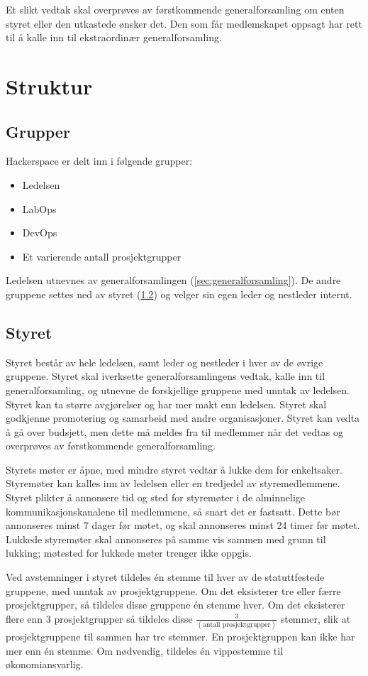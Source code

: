 Et slikt vedtak skal overprøves av førstkommende generalforsamling om enten styret eller den utkastede ønsker det. Den som får medlemskapet oppsagt har rett til å kalle inn til ekstraordinær generalforsamling.


\section{Struktur}\label{sec:struktur}
\subsection{Grupper}\label{sec:struktur:grupper}
Hackerspace er delt inn i følgende grupper:
\begin{itemize}
\item Ledelsen
\item LabOps
\item DevOps
\item Et varierende antall prosjektgrupper
\end{itemize}
Ledelsen utnevnes av generalforsamlingen (\ref{sec:generalforsamling}). De andre gruppene settes ned av styret (\ref{sec:struktur:styret}) og velger sin egen leder og nestleder internt.

\subsection{Styret}\label{sec:struktur:styret}
Styret består av hele ledelsen, samt leder og nestleder i hver av de øvrige gruppene.
Styret skal iverksette generalforsamlingens vedtak, kalle inn til generalforsamling, og utnevne de forskjellige gruppene med unntak av ledelsen.
Styret kan ta større avgjørelser og har mer makt enn ledelsen.
Styret skal godkjenne promotering og samarbeid med andre organisasjoner.
Styret kan vedta å gå over budsjett, men dette må meldes fra til medlemmer når det vedtas og overprøves av førstkommende generalforsamling.

Styrets møter er åpne, med mindre styret vedtar å lukke dem for enkeltsaker.
Styremøter kan kalles inn av ledelsen eller en tredjedel av styremedlemmene.
Styret plikter å annonsere tid og sted for styremøter i de alminnelige kommunikasjonskanalene til medlemmene, så snart det er fastsatt.
Dette bør annonseres minst 7 dager før møtet, og skal annonseres minst 24 timer før møtet.
Lukkede styremøter skal annonseres på samme vis sammen med grunn til lukking; møtested for lukkede møter trenger ikke oppgis.

Ved avstemninger i styret tildeles én stemme til hver av de statuttfestede gruppene, med unntak av prosjektgruppene. 
Om det eksisterer tre eller færre prosjektgrupper, så tildeles disse gruppene én stemme hver. Om det eksisterer flere enn 3 prosjektgrupper så tildeles disse $\frac{3}{(\text{antall prosjektgrupper})}$ stemmer, slik at prosjektgruppene til sammen har tre stemmer. En prosjektgruppen kan ikke har mer enn én stemme.
Om nødvendig, tildeles én vippestemme til økonomiansvarlig.

